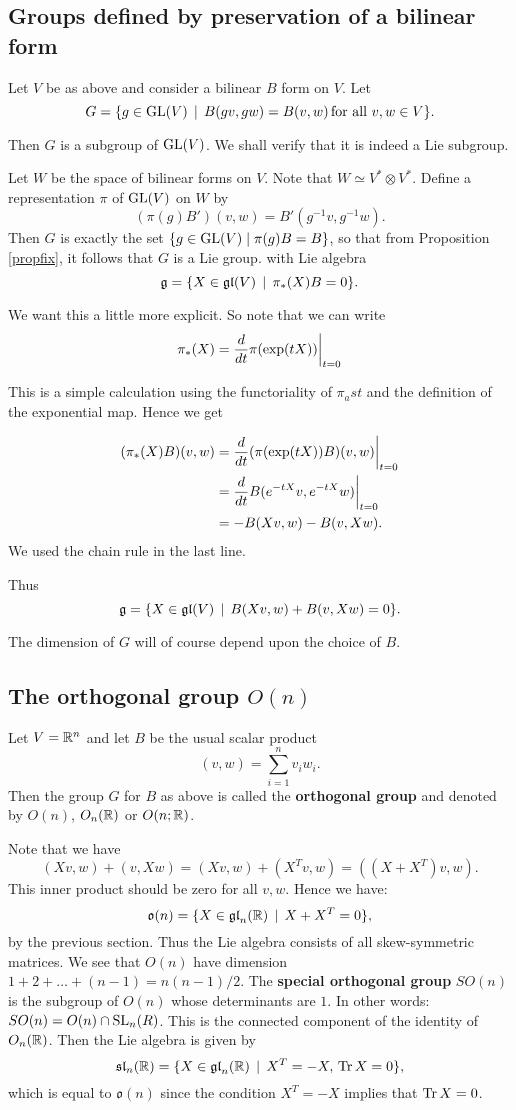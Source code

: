 \documentclass[11pt, english]{article}
\begin{document}
\subsection{Groups defined by preservation of a bilinear form}

Let $V$ be as above and consider a bilinear $B$ form on $V$. Let
$$
G = \{ g \in \operatorname{GL}(V) \, \mid  \, B(gv,gw)=B(v,w) \, \text{for all } v,w \in V \}.
$$

Then $G$ is a subgroup of $\operatorname{GL}(V)$. We shall verify that it is indeed a Lie subgroup.

Let $W$ be the space of bilinear forms on $V$. Note that $W \simeq V^\ast \otimes V^\ast$. Define a representation $\pi$ of $\operatorname{GL}(V)$ on $W$ by
$$
(\pi(g)B')(v,w) = B'(g^{-1}v,g^{-1}w).
$$
Then $G$ is exactly the set $\{  g \in \operatorname{GL}(V) \mid \pi(g) B = B \}$, so that from Proposition \ref{propfix}, it follows that $G$ is a Lie group. with Lie algebra
$$
\mathfrak g = \{X \in \mathfrak{gl}(V) \, \mid \, \pi_\ast(X) B = 0 \}.
$$

We want this a little more explicit. So note that we can write
$$
\pi_\ast(X) = \restr{\frac{d}{dt}\pi(\exp(t X)) }{t=0}
$$

This is a simple calculation using the functoriality of $\pi_ast$ and the definition of the exponential map. Hence we get

\begin{align*}
(\pi_\ast(X) B)(v,w) &= \restr{\frac{d}{dt} (\pi(\exp(tX))B)(v,w) }{t=0} \\
&= \restr{\frac{d}{dt}  B(e^{-tX} v, e^{-tX} w)}{t=0} \\
&= -B(Xv,w)-B(v,Xw).
\end{align*}
We used the chain rule in the last line.

Thus
$$
\mathfrak g =  \{X \in \mathfrak{gl}(V) \, \mid \, B(Xv,w)+B(v,Xw) = 0 \}.
$$

The dimension of $G$ will of course depend upon the choice of $B$.

\subsection{The orthogonal group $O(n)$}

Let $V=\mathbb{R}^n$ and let $B$ be the usual scalar product
$$
(v,w) = \sum_{i=1}^n v_i w_i.
$$
Then the group $G$ for $B$ as above is called the \textbf{orthogonal group} and denoted by $O(n)$, $O_n(\mathbb{R})$ or $O(n; \mathbb{R})$. 

Note that we have
$$
(Xv,w)+(v,Xw) = (Xv,w)+(X^Tv,w)= ((X+X^T)v,w).
$$
This inner product should be zero for all $v,w$. Hence we have:
$$
\mathfrak{o}(n) = \{ X \in \mathfrak{gl}_n(\mathbb{R}) \, \mid \, X+X^T = 0 \},
$$
by the previous section. Thus the Lie algebra consists of all skew-symmetric matrices. We see that $O(n)$ have dimension $1+2+\ldots+(n-1)=n(n-1)/2$. The \textbf{special orthogonal group} $SO(n)$ is the subgroup of $O(n)$ whose determinants are $1$. In other words: $SO(n) = O(n) \cap \operatorname{SL}_n(R)$. This is the connected component of the identity of $O_n(\mathbb{R})$. Then the Lie algebra is given by
$$
\mathfrak{sl}_n(\mathbb{R}) = \{ X \in \mathfrak{gl}_n(\mathbb{R}) \, \mid \, X^T=-X, \, \operatorname{Tr} X = 0 \},
$$
which is equal to $\mathfrak{o}(n)$ since the condition $X^T=-X$ implies that $\operatorname{Tr} X = 0$.
\end{document}

